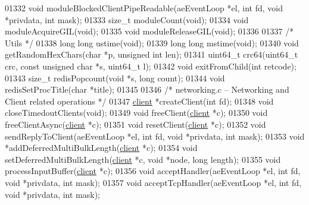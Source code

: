 \begin{DoxyCode}
{{{{{{{01332 \textcolor{keywordtype}{void} moduleBlockedClientPipeReadable(aeEventLoop *el, \textcolor{keywordtype}{int} fd, \textcolor{keywordtype}{void} *privdata, \textcolor{keywordtype}{int} mask);
01333 size\_t moduleCount(\textcolor{keywordtype}{void});
01334 \textcolor{keywordtype}{void} moduleAcquireGIL(\textcolor{keywordtype}{void});
01335 \textcolor{keywordtype}{void} moduleReleaseGIL(\textcolor{keywordtype}{void});
01336 
01337 \textcolor{comment}{/* Utils */}
01338 \textcolor{keywordtype}{long} \textcolor{keywordtype}{long} ustime(\textcolor{keywordtype}{void});
01339 \textcolor{keywordtype}{long} \textcolor{keywordtype}{long} mstime(\textcolor{keywordtype}{void});
01340 \textcolor{keywordtype}{void} getRandomHexChars(\textcolor{keywordtype}{char} *p, \textcolor{keywordtype}{unsigned} \textcolor{keywordtype}{int} len);
01341 uint64\_t crc64(uint64\_t crc, \textcolor{keyword}{const} \textcolor{keywordtype}{unsigned} \textcolor{keywordtype}{char} *s, uint64\_t l);
01342 \textcolor{keywordtype}{void} exitFromChild(\textcolor{keywordtype}{int} retcode);
01343 size\_t redisPopcount(\textcolor{keywordtype}{void} *s, \textcolor{keywordtype}{long} count);
01344 \textcolor{keywordtype}{void} redisSetProcTitle(\textcolor{keywordtype}{char} *title);
01345 
01346 \textcolor{comment}{/* networking.c -- Networking and Client related operations */}
01347 \hyperlink{structclient}{client} *createClient(\textcolor{keywordtype}{int} fd);
01348 \textcolor{keywordtype}{void} closeTimedoutClients(\textcolor{keywordtype}{void});
01349 \textcolor{keywordtype}{void} freeClient(\hyperlink{structclient}{client} *c);
01350 \textcolor{keywordtype}{void} freeClientAsync(\hyperlink{structclient}{client} *c);
01351 \textcolor{keywordtype}{void} resetClient(\hyperlink{structclient}{client} *c);
01352 \textcolor{keywordtype}{void} sendReplyToClient(aeEventLoop *el, \textcolor{keywordtype}{int} fd, \textcolor{keywordtype}{void} *privdata, \textcolor{keywordtype}{int} mask);
01353 \textcolor{keywordtype}{void} *addDeferredMultiBulkLength(\hyperlink{structclient}{client} *c);
01354 \textcolor{keywordtype}{void} setDeferredMultiBulkLength(\hyperlink{structclient}{client} *c, \textcolor{keywordtype}{void} *node, \textcolor{keywordtype}{long} length);
01355 \textcolor{keywordtype}{void} processInputBuffer(\hyperlink{structclient}{client} *c);
01356 \textcolor{keywordtype}{void} acceptHandler(aeEventLoop *el, \textcolor{keywordtype}{int} fd, \textcolor{keywordtype}{void} *privdata, \textcolor{keywordtype}{int} mask);
01357 \textcolor{keywordtype}{void} acceptTcpHandler(aeEventLoop *el, \textcolor{keywordtype}{int} fd, \textcolor{keywordtype}{void} *privdata, \textcolor{keywordtype}{int} mask);
}}}}}}}
\end{DoxyCode}
